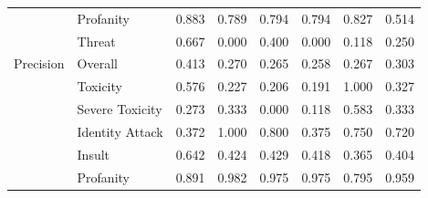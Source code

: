 \documentclass[11pt]{article}
\begin{document}
\begin{table}[h]
\begin{tabular}{llllllll}
\multicolumn{1}{l|}{}                & \multicolumn{1}{l|}{Profanity}          & 0.883 & 0.789     & 0.794   & 0.794      & 0.827                                                                           & 0.514                                                                           \\ \cline{2-8} 
\multicolumn{1}{l|}{}                & \multicolumn{1}{l|}{Threat}             & 0.667 & 0.000     & 0.400   & 0.000      & 0.118                                                                           & 0.250                                                                           \\ \hline
\multicolumn{1}{l|}{Precision}       & \multicolumn{1}{l|}{Overall}            & 0.413 & 0.270     & 0.265   & 0.258      & 0.267                                                                           & 0.303                                                                           \\ \cline{2-8} 
\multicolumn{1}{l|}{}                & \multicolumn{1}{l|}{Toxicity}           & 0.576 & 0.227     & 0.206   & 0.191      & 1.000                                                                           & 0.327                                                                           \\ \cline{2-8} 
\multicolumn{1}{l|}{}                & \multicolumn{1}{l|}{Severe Toxicity}    & 0.273 & 0.333     & 0.000   & 0.118      & 0.583                                                                           & 0.333                                                                           \\ \cline{2-8} 
\multicolumn{1}{l|}{}                & \multicolumn{1}{l|}{Identity Attack}    & 0.372 & 1.000     & 0.800   & 0.375      & 0.750                                                                           & 0.720                                                                           \\ \cline{2-8} 
\multicolumn{1}{l|}{}                & \multicolumn{1}{l|}{Insult}             & 0.642 & 0.424     & 0.429   & 0.418      & 0.365                                                                           & 0.404                                                                           \\ \cline{2-8} 
\multicolumn{1}{l|}{}                & \multicolumn{1}{l|}{Profanity}          & 0.891 & 0.982     & 0.975   & 0.975      & 0.795                                                                           & 0.959                                                                           \\ \cline{2-8} 

\end{tabular}
\end{table}
\end{document}
